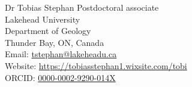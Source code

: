 \documentclass[10pt, paper=letter]{scrartcl} %
\begin{document}

\begin{cv}{Dr Tobias Stephan}
\medskip
\noindent  Postdoctoral associate\smallskip \\
Lakehead University\\
Department of Geology\\
Thunder Bay, ON, Canada\smallskip \\
\noindent Email: \href{mailto:tstephan@lakeheadu.ca}{tstephan@lakeheadu.ca}\\
Website: \href{https://tobiasstephan1.wixsite.com/tobi}{https://tobiasstephan1.wixsite.com/tobi}\\
ORCID: \href{https://orcid.org/0000-0002-9290-014X}{0000-0002-9290-014X}

\medskip

% 
% 


\end{cv}
\end{document}
